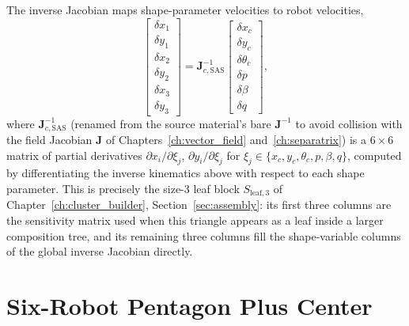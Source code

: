 \documentclass[12pt, letterpaper, oneside]{report}
\begin{document}
The inverse Jacobian maps shape-parameter velocities to robot velocities,
\begin{equation}
\begin{bmatrix} \delta x_1 \\ \delta y_1 \\ \delta x_2 \\ \delta y_2 \\ \delta x_3 \\ \delta y_3 \end{bmatrix}
= \mathbf{J}_{c,\text{SAS}}^{-1}
\begin{bmatrix} \delta x_c \\ \delta y_c \\ \delta\theta_c \\ \delta p \\ \delta\beta \\ \delta q \end{bmatrix},
\end{equation}
where $\mathbf{J}_{c,\text{SAS}}^{-1}$ (renamed from the source material's
bare $\mathbf{J}^{-1}$ to avoid collision with the field Jacobian
$\mathbf{J}$ of Chapters~\ref{ch:vector_field} and~\ref{ch:separatrix}) is a
$6\times6$ matrix of partial derivatives
$\partial x_i/\partial\xi_j$, $\partial y_i/\partial\xi_j$ for
$\xi_j\in\{x_c,y_c,\theta_c,p,\beta,q\}$, computed by differentiating the
inverse kinematics above with respect to each shape parameter. This is
precisely the size-3 leaf block $S_{\text{leaf},3}$ of
Chapter~\ref{ch:cluster_builder}, Section~\ref{sec:assembly}: its first
three columns are the sensitivity matrix used when this triangle appears as
a leaf inside a larger composition tree, and its remaining three columns
fill the shape-variable columns of the global inverse Jacobian directly.

\section{Six-Robot Pentagon Plus Center}
\label{app:pentagon_kinematics}
\end{document}
